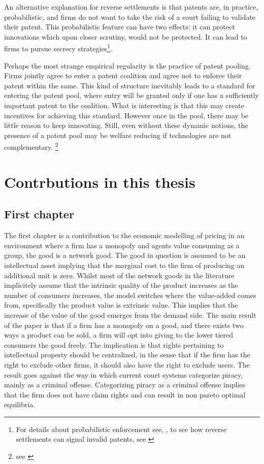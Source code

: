 An alternative explanation for reverse settlements is that patents are, in practice, probabilistic, and firms do not want to take the risk of a court failing to validate their patent. This probabilistic feature can have two effects: it can protect innovations which upon closer scrutiny, would not be protected. It can lead to firms to pursue secrecy strategies\footnote{For details about probabilistic enforcement see, \cite{Lemley2005}, to see how reverse settlements can signal invalid patents, see \cite{Dolin2011}}.

Perhaps the most strange empirical regularity is the practice of patent pooling. Firms jointly agree to enter a patent coalition and agree not to enforce their patent within the same. This kind of structure inevitably leads to a standard for entering the patent pool, where entry will be granted only if one has a sufficiently important patent to the coalition. What is interesting is that this may create incentives for achieving this standard. However once in the pool, there may be little reason to keep innovating. Still, even without these dynamic notions, the presence of a patent pool may be welfare reducing if technologies are not complementary. \footnote{see \cite{Lerner2004}}

\section{Contrbutions in this thesis}

\subsection{First chapter}

The first chapter is a contribution to the economic modelling of pricing in an environment where a firm has a monopoly and agents value consuming as a group, the good is a network good. The good in question is assumed to be an intellectual asset implying that the marginal cost to the firm of producing an additional unit is zero. Whilst most of the network goods in the literature implicitely assume that the intrinsic quality of the product increases as the number of consumers increases, the model switches where the value-added comes from, specifically the product value is extrinsic value. This implies that the increase of the value of the good emerges from the demand side. The main result of the paper is that if a firm has a monopoly on a good, and there exists two ways a product can be sold, a firm will opt into giving to the lower tiered consumers the good freely. The implication is that rights pertaining to intellectual property should be centralized, in the sense that if the firm has the right to exclude other firms, it should also have the right to exclude users. The result goes against the way in which current court systems categorize piracy, mainly as a criminal offense. Categorizing piracy as a criminal offense implies that the firm does not have claim rights and can result in non pareto optimal equilibria. 

